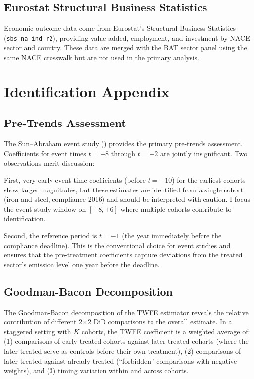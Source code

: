 \documentclass[12pt]{article}
\begin{document}
\subsection{Eurostat Structural Business Statistics}

Economic outcome data come from Eurostat's Structural Business Statistics (\texttt{sbs\_na\_ind\_r2}), providing value added, employment, and investment by NACE sector and country. These data are merged with the BAT sector panel using the same NACE crosswalk but are not used in the primary analysis.


\section{Identification Appendix}
\label{sec:id_appendix}

\subsection{Pre-Trends Assessment}

The Sun--Abraham event study () provides the primary pre-trends assessment. Coefficients for event times $t = -8$ through $t = -2$ are jointly insignificant. Two observations merit discussion:

First, very early event-time coefficients (before $t = -10$) for the earliest cohorts show larger magnitudes, but these estimates are identified from a single cohort (iron and steel, compliance 2016) and should be interpreted with caution. I focus the event study window on $[-8, +6]$ where multiple cohorts contribute to identification.

Second, the reference period is $t = -1$ (the year immediately before the compliance deadline). This is the conventional choice for event studies and ensures that the pre-treatment coefficients capture deviations from the treated sector's emission level one year before the deadline.

\subsection{Goodman-Bacon Decomposition}

The Goodman-Bacon decomposition of the TWFE estimator reveals the relative contribution of different 2$\times$2 DiD comparisons to the overall estimate. In a staggered setting with $K$ cohorts, the TWFE coefficient is a weighted average of: (1) comparisons of early-treated cohorts against later-treated cohorts (where the later-treated serve as controls before their own treatment), (2) comparisons of later-treated against already-treated (``forbidden'' comparisons with negative weights), and (3) timing variation within and across cohorts.
\end{document}
